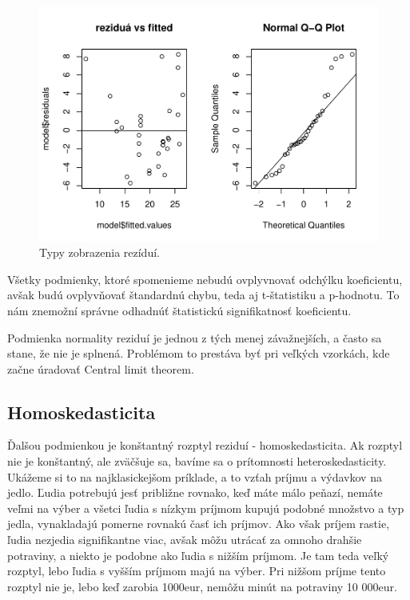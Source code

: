 \begin{figure}
\begin{center}
\includegraphics{test_files/figure-latex/unnamed-chunk-50-1.pdf}
\caption{Typy zobrazenia rezíduí.}
\end{center}
\end{figure}

\newpage

Všetky podmienky, ktoré spomenieme nebudú ovplyvnovať odchýlku
koeficientu, avšak budú ovplyvňovať štandardnú chybu, teda aj
t-štatistiku a p-hodnotu. To nám znemožní správne odhadnúť štatistickú
signifikatnosť koeficientu.

Podmienka normality reziduí je jednou z tých menej závažnejších, a často
sa stane, že nie je splnená. Problémom to prestáva byť pri veľkých
vzorkách, kde začne úradovať Central limit theorem.

\hypertarget{homoskedasticita}{%
\subsection{Homoskedasticita}\label{homoskedasticita}}

Ďalšou podmienkou je konštantný rozptyl reziduí - homoskedasticita. Ak
rozptyl nie je konštantný, ale zväčšuje sa, bavíme sa o prítomnosti
heteroskedasticity. Ukážeme si to na najklasickejšom príklade, a to
vzťah príjmu a výdavkov na jedlo. Ľudia potrebujú jesť približne
rovnako, keď máte málo peňazí, nemáte veľmi na výber a všetci ľudia s
nízkym príjmom kupujú podobné množstvo a typ jedla, vynakladajú pomerne
rovnakú časť ich príjmov. Ako však príjem rastie, ľudia nezjedia
signifikantne viac, avšak môžu utrácať za omnoho drahšie potraviny, a
niekto je podobne ako ľudia s nižším príjmom. Je tam teda veľký rozptyl,
lebo ľudia s vyšším príjmom majú na výber. Pri nižšom príjme tento
rozptyl nie je, lebo keď zarobia 1000eur, nemôžu minút na potraviny 10
000eur.

